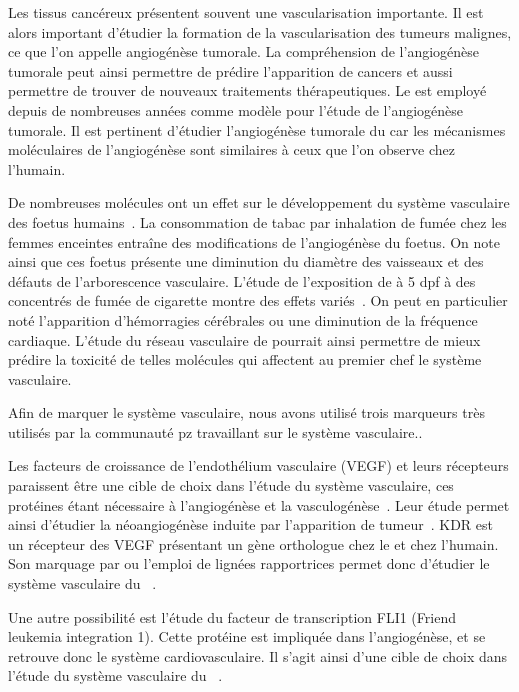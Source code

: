 \documentclass[\main/main.tex]{subfiles}
\begin{document}
%
Les tissus cancéreux présentent souvent une vascularisation importante.
%
Il est alors important d'étudier la formation de la vascularisation des tumeurs malignes, ce que l'on appelle angiogénèse tumorale.
%
La compréhension de l'angiogénèse tumorale peut ainsi permettre de prédire
l'apparition de cancers et aussi permettre de trouver de nouveaux traitements
thérapeutiques.
%
Le \pz{} est employé depuis de nombreuses années comme modèle pour l'étude de l'angiogénèse tumorale\cite{nicoli_2007,guerra_2020,letrado_2018}.
%
Il est pertinent d'étudier l'angiogénèse tumorale du \pz{} car les mécanismes moléculaires de l'angiogénèse sont similaires à ceux que l'on observe chez l'humain\cite{tobia_2011}.

%
De nombreuses molécules ont un effet sur le développement du système vasculaire des foetus humains~\cite{knudsen_2011}.
%
La consommation de tabac par inhalation de fumée chez les femmes enceintes
entraîne des modifications de l'angiogénèse du foetus.
%
On note ainsi que ces foetus présente une diminution du diamètre des vaisseaux
et des défauts de l'arborescence vasculaire.
%
L'étude de l'exposition de \pz{} à 5 dpf à des concentrés de fumée de cigarette
montre des effets variés~\cite{ellis_2014,massarsky_2018}.
%
On peut en particulier noté l'apparition d'hémorragies cérébrales ou une diminution de la fréquence cardiaque.
%
L'étude du réseau vasculaire de \pz{} pourrait ainsi permettre de mieux prédire la toxicité de telles molécules qui affectent au premier chef le système vasculaire.%

%
Afin de marquer le système vasculaire, nous avons utilisé trois marqueurs très utilisés par la communauté pz travaillant sur le système vasculaire..
%

Les facteurs de croissance de l'endothélium vasculaire (VEGF) et leurs récepteurs paraissent être une cible de choix dans l'étude du système vasculaire,
ces protéines étant nécessaire à  l'angiogénèse et la vasculogénèse~\cite{bahari_2007}.
%
Leur étude permet ainsi d'étudier la néoangiogénèse induite par l'apparition de tumeur~\cite{nicoli_2007}.
%
KDR est un récepteur des VEGF présentant un gène orthologue chez le \pz{} et chez l'humain.
%
Son marquage par \ihcie{} ou l'emploi de lignées rapportrices permet donc d'étudier le système vasculaire du \pz{}~\cite{savage_2019}.

Une autre possibilité est l'étude du facteur de transcription FLI1 (Friend leukemia integration 1).
%
Cette protéine est impliquée dans l'angiogénèse, et se retrouve donc le système cardiovasculaire.
%
Il s'agit ainsi d'une cible de choix dans l'étude du système vasculaire du \pz{}~\cite{letrado_2018}.
\end{document}
